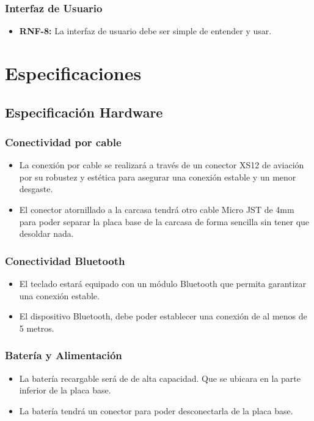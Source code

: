 \subsubsection{Interfaz de Usuario} \label{DiseñoInterfazUsuario}
\begin{itemize}
\item \textbf{RNF-8:} La interfaz de usuario debe ser simple de entender y usar.
\end{itemize}

\section{Especificaciones}

\subsection{Especificación Hardware}

\subsubsection{Conectividad por cable}
\begin{itemize}
\item La conexión por cable se realizará a través de un conector XS12 de aviación por su robustez y estética para asegurar una conexión estable y un menor desgaste.
\item El conector atornillado a la carcasa tendrá otro cable Micro JST de 4mm para poder separar la placa base de la carcasa de forma sencilla sin tener que desoldar nada.
\end{itemize}

\subsubsection{Conectividad \gls{Bluetooth}}
\begin{itemize}
\item El teclado estará equipado con un módulo \gls{Bluetooth} que permita garantizar una conexión estable.
\item El dispositivo \gls{Bluetooth}, debe poder establecer una conexión de al menos de 5 metros.
\end{itemize}

\subsubsection{Batería y Alimentación} \label{DiseñoBateriaAlimentacion}
\begin{itemize}
\item La batería recargable será de  de alta capacidad. Que se ubicara en la parte inferior de la placa base.
\item La batería tendrá un conector para poder desconectarla de la placa base.
\end{itemize}

